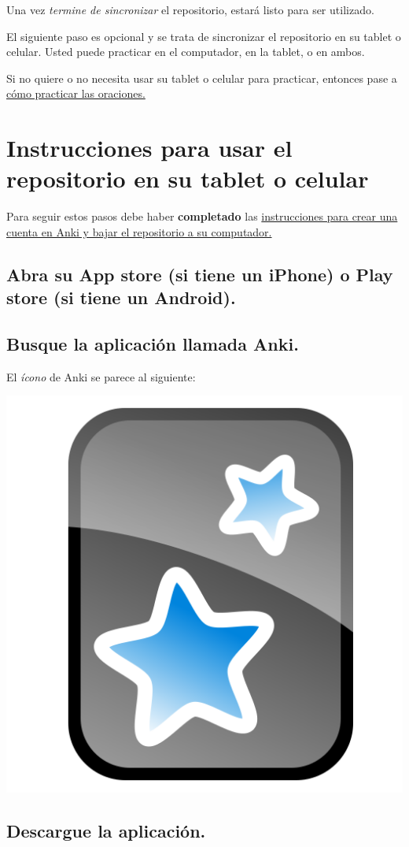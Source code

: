 \documentclass[
]{book}
\begin{document}
Una vez \emph{termine de sincronizar} el repositorio, estará listo para ser utilizado.

El siguiente paso es opcional y se trata de sincronizar el repositorio en su tablet o celular. Usted puede practicar en el computador, en la tablet, o en ambos.

Si no quiere o no necesita usar su tablet o celular para practicar, entonces pase a \protect\hyperlink{cross_4}{cómo practicar las oraciones.}

\hypertarget{instrucciones-para-usar-el-repositorio-en-su-tablet-o-celular}{%
\chapter{Instrucciones para usar el repositorio en su tablet o celular}\label{instrucciones-para-usar-el-repositorio-en-su-tablet-o-celular}}

Para seguir estos pasos debe haber \textbf{completado} las \protect\hyperlink{cross_0}{instrucciones para crear una cuenta en Anki y bajar el repositorio a su computador.}

\hypertarget{abra-su-app-store-si-tiene-un-iphone-o-play-store-si-tiene-un-android.}{%
\section{Abra su App store (si tiene un iPhone) o Play store (si tiene un Android).}\label{abra-su-app-store-si-tiene-un-iphone-o-play-store-si-tiene-un-android.}}

\hypertarget{busque-la-aplicaciuxf3n-llamada-anki.}{%
\section{Busque la aplicación llamada Anki.}\label{busque-la-aplicaciuxf3n-llamada-anki.}}

El \emph{ícono} de Anki se parece al siguiente:

\includegraphics[width=0.1\linewidth]{images/reposit_sp/Anki_logo}

\hypertarget{descargue-la-aplicaciuxf3n.}{%
\section{Descargue la aplicación.}\label{descargue-la-aplicaciuxf3n.}}
\end{document}
